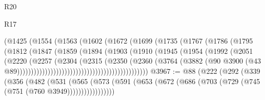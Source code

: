 \begin{lexlean}{R20}
\begin{lexlean}{R17}
\begin{coremodule}
{{{{{{{{{{{{{{{{{{{{{{{{{{{{{{{{{{{{{{{{{{{{{{{{{{{{{{{{{{{{{{{{{{{{{{{{{{{{{{{{{{{{{{{{{{{{{{{{{{{{{{{{{{{                                      (@1425
                                        (@1554
                                          (@1563
                                            (@1602
                                              (@1672
                                                (@1699
                                                  (@1735
                                                    (@1767
                                                      (@1786
                                                        (@1795
                                                          (@1812
                                                            (@1847
                                                              (@1859
                                                                (@1894
                                                                  (@1903
                                                                    (@1910
                                                                      (@1945
                                                                        (@1954
                                                                          (@1992
                                                                            (@2051
                                                                              (@2220
                                                                                (@2257
                                                                                  (@2304
                                                                                    (@2315
                                                                                      (@2350
                                                                                        (@2360
                                                                                          (@3764
                                                                                            (@3882
                                                                                              (@90
                                                                                                @3900
                                                                                                (@43
                                                                                                  @89)))))))))))))))))))))))))))))))))))))))))))))))
@3967 := @88
    (@222
      (@292
        (@339
          (@356
            (@482
              (@531
                (@565
                  (@573 (@591 (@653 (@672 (@686 (@703 (@729 (@745 (@751 (@760 @3949)))))))))))))))))
}}}}}}}}}}}}}}}}}}}}}}}}}}}}}}}}}}}}}}}}}}}}}}}}}}}}}}}}}}}}}}}}}}}}}}}}}}}}}}}}}}}}}}}}}}}}}}}}}}}}}}}}}}}
\end{coremodule}
\end{lexlean}
\end{lexlean}

